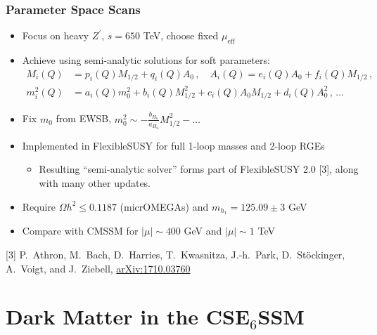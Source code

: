 \documentclass[10pt,aspectratio=169]{beamer}
\begin{document}
\begin{frame}
  \frametitle{Parameter Space Scans}
  \begin{itemize}\itemsep1em
    \item Focus on heavy $Z^\prime$, $s = 650$ TeV, choose fixed
      $\mu_{\text{eff}}$
    \item Achieve using semi-analytic solutions for soft parameters:
      \begin{align*}
        M_i(Q) &= p_i(Q) M_{1/2} + q_i(Q) A_0 \, , \quad
        A_i(Q) = e_i(Q) A_0 + f_i(Q) M_{1/2} \, , \\
        m_i^2(Q) &= a_i(Q) m_0^2 + b_i(Q) M_{1/2}^2 + c_i(Q) A_0 M_{1/2}
        + d_i(Q) A_0^2 \, , \, \ldots
      \end{align*}
    \item Fix $m_0$ from EWSB,
      $m_0^2 \sim -\frac{b_{H_u}}{a_{H_u}} M_{1/2}^2 - \ldots$
    \item Implemented in FlexibleSUSY for {\color{blue} full 1-loop masses
      and 2-loop RGEs}
      \begin{itemize}
      \item Resulting ``semi-analytic solver'' forms part of
        FlexibleSUSY 2.0 [3], along with many other updates.
      \end{itemize}
    \item Require $\Omega h^2 \leq 0.1187$ (micrOMEGAs) and
      $m_{h_1} = 125.09 \pm 3$ GeV
    \item Compare with CMSSM for $|\mu| \sim 400$ GeV and $|\mu| \sim
      1$ TeV
  \end{itemize}
  \vfill
      {\tiny [3] P.~Athron, M.~Bach, D.~Harries, T.~Kwasnitza,
        J.-h.~Park, D.~St\"{o}ckinger, A.~Voigt, and J.~Ziebell,
        \href{http://arxiv.org/abs/1710.03760}{arXiv:1710.03760}
      }
\end{frame}

\section{Dark Matter in the CSE$_6$SSM}
\end{document}
